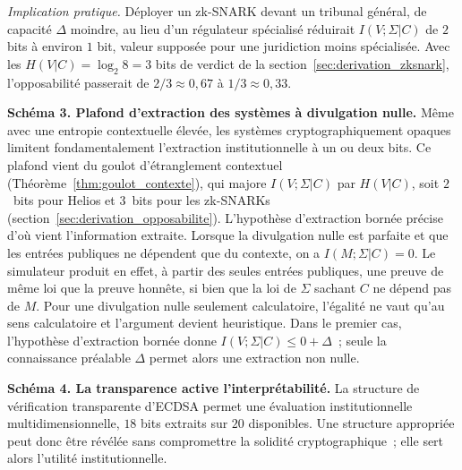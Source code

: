 \begin{sloppypar}
\noindent\textit{Implication pratique.} D\'eployer un zk-SNARK devant un
tribunal g\'en\'eral, de capacit\'e $\Delta$ moindre, au lieu d'un
r\'egulateur sp\'ecialis\'e
r\'eduirait $I(V;\Sigma|C)$ de $2$ bits \`a environ $1$ bit, valeur suppos\'ee pour une
juridiction moins sp\'ecialis\'ee. Avec les $H(V|C) = \log_2 8 = 3$ bits de verdict de la
section~\ref{sec:derivation_zksnark}, l'opposabilit\'e passerait de $2/3 \approx 0{,}67$ \`a
$1/3 \approx 0{,}33$.

\medskip
\noindent\textbf{Sch\'ema 3. Plafond d'extraction des syst\`emes
\`a divulgation nulle.} M\^eme avec une entropie contextuelle \'elev\'ee,
les syst\`emes cryptographiquement opaques limitent fondamentalement
l'extraction institutionnelle \`a un ou deux bits. Ce plafond vient du goulot
d'\'etranglement contextuel (Th\'eor\`eme~\ref{thm:goulot_contexte}), qui majore
$I(V;\Sigma|C)$ par $H(V|C)$, soit $2$~bits pour Helios et $3$~bits pour les
zk-SNARKs (section~\ref{sec:derivation_opposabilite}). L'hypoth\`ese d'extraction
born\'ee pr\'ecise d'o\`u vient l'information extraite. Lorsque la divulgation nulle est parfaite et que
les entr\'ees publiques ne d\'ependent que du contexte, on a $I(M;\Sigma|C) = 0$. Le
simulateur produit en effet, \`a partir des seules entr\'ees publiques, une preuve de
m\^eme loi que la preuve honn\^ete, si bien que la loi de $\Sigma$ sachant $C$ ne d\'epend
pas de $M$. Pour une divulgation nulle seulement calculatoire, l'\'egalit\'e ne vaut qu'au
sens calculatoire et l'argument devient heuristique. Dans le premier cas,
l'hypoth\`ese d'extraction born\'ee donne $I(V;\Sigma|C) \leq 0 + \Delta$~; seule la connaissance pr\'ealable
$\Delta$ permet alors une extraction non nulle.

\medskip
\noindent\textbf{Sch\'ema 4. La transparence active l'interpr\'etabilit\'e.}
La structure de v\'erification transparente d'ECDSA permet une
\'evaluation institutionnelle multidimensionnelle, $18$ bits extraits
sur $20$ disponibles. Une structure appropri\'ee peut donc \^etre
r\'ev\'el\'ee sans compromettre la solidit\'e cryptographique~; elle sert alors
l'utilit\'e institutionnelle.
\end{sloppypar}

